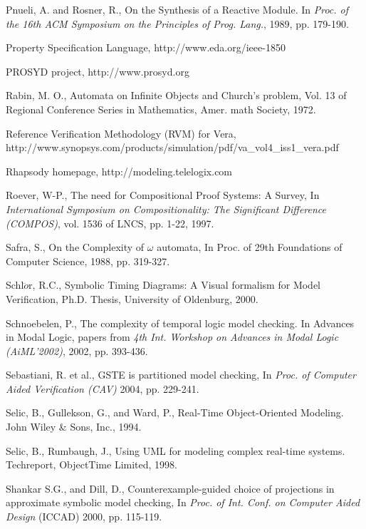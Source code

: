{\begin{thebibliography}{99}
 Pnueli, A. and Rosner, R., On the Synthesis of a Reactive
	Module. In {\em Proc. of the 16th ACM Symposium on the Principles of
        Prog. Lang.}, 1989, pp. 179-190.

 Property Specification Language, http://www.eda.org/ieee-1850 

 PROSYD project, http://www.prosyd.org 

 Rabin, M. O., Automata on Infinite Objects and Church's 
	problem, Vol. 13 of Regional Conference Series in Mathematics, 
	Amer. math Society, 1972.

 Reference Verification Methodology (RVM) for Vera, \\
        http://www.synopsys.com/products/simulation/pdf/va\_vol4\_iss1\_vera.pdf

 Rhapsody homepage,
    http://modeling.telelogix.com

 Roever, W-P., The need for Compositional Proof Systems:
        A Survey,
        In {\em International Symposium on Compositionality: The Significant
        Difference (COMPOS)}, vol. 1536 of LNCS, pp. 1-22, 1997. 

 Safra, S., On the Complexity of $\omega$ automata, 
	In Proc. of 29th Foundations of Computer Science, 1988, pp. 319-327.

 Schl$\ddot{o}$r, R.C., Symbolic Timing Diagrams: A Visual
        formalism for Model Verification, Ph.D. Thesis,
        University of Oldenburg, 2000. 

 Schnoebelen, P., The complexity of temporal logic
	model checking. In Advances in Modal Logic, papers from {\em 4th 
	Int. Workshop on Advances in Modal Logic (AiML'2002)}, 
	2002, pp. 393-436.

 Sebastiani, R. et al., GSTE is partitioned model
        checking, In {\em Proc. of Computer Aided Verification (CAV)} 
	2004, pp. 229-241.

 Selic, B., Gullekson, G., and Ward, P., Real-Time
    Object-Oriented Modeling. John Wiley \& Sons, Inc., 1994. 

 Selic, B., Rumbaugh, J.,
    Using UML for modeling complex real-time systems.
    Techreport, ObjectTime Limited, 1998. 

 Shankar S.G., and Dill, D., Counterexample-guided
        choice of projections in approximate symbolic model
        checking, In {\em Proc. of Int. Conf. on Computer
	Aided Design} (ICCAD) 2000, pp. 115-119.


\end{thebibliography}}
